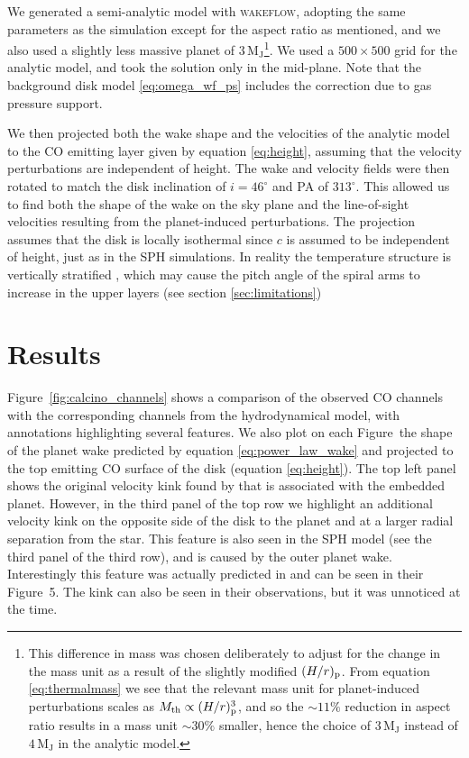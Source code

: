 We generated a semi-analytic model with \textsc{wakeflow}, adopting the same parameters as the simulation except for the aspect ratio as mentioned, and we also used a slightly less massive planet of $3 \, \mathrm{M_J}$\footnote{This difference in mass was chosen deliberately to adjust for the change in the mass unit as a result of the slightly modified $(H/r)_{\rm p}$. From equation \ref{eq:thermalmass} we see that the relevant mass unit for planet-induced perturbations scales as $M_{\rm th} \propto (H/r)_{\rm p}^3$, and so the $\sim 11 \%$ reduction in aspect ratio results in a mass unit $\sim 30 \%$ smaller, hence the choice of $3 \, \mathrm{M_J}$ instead of $4 \, \mathrm{M_J}$ in the analytic model.}.
We used a $500 \times 500$ grid for the analytic model, and took the solution only in the mid-plane.
Note that the background disk model \ref{eq:omega_wf_ps} includes the correction due to gas pressure support.

We then projected both the wake shape and the velocities of the analytic model to the CO emitting layer given by equation \ref{eq:height}, assuming that the velocity perturbations are independent of height.
The wake and velocity fields were then rotated to match the disk inclination of $i=46^{\circ}$ and PA of $313^{\circ}$.
This allowed us to find both the shape of the wake on the sky plane and the line-of-sight velocities resulting from the planet-induced perturbations.
The projection assumes that the disk is locally isothermal since $c$ is assumed to be independent of height, just as in the SPH simulations.
In reality the temperature structure is vertically stratified \citep{calahan2021}, which may cause the pitch angle of the spiral arms to increase in the upper layers (see section \ref{sec:limitations})

\section{Results}

Figure~\ref{fig:calcino_channels} shows a comparison of the observed CO channels with the corresponding channels from the hydrodynamical model, with annotations highlighting several features.
We also plot on each Figure~the shape of the planet wake predicted by equation \ref{eq:power_law_wake} and projected to the top emitting CO surface of the disk (equation \ref{eq:height}).
The top left panel shows the original velocity kink found by \citep{pinte2018a} that is associated with the embedded planet.
However, in the third panel of the top row we highlight an additional velocity kink on the opposite side of the disk to the planet and at a larger radial separation from the star.
This feature is also seen in the SPH model (see the third panel of the third row), and is caused by the outer planet wake.
Interestingly this feature was actually predicted in \citep{pinte2018a} and can be seen in their Figure~5.
The kink can also be seen in their observations, but it was unnoticed at the time.

